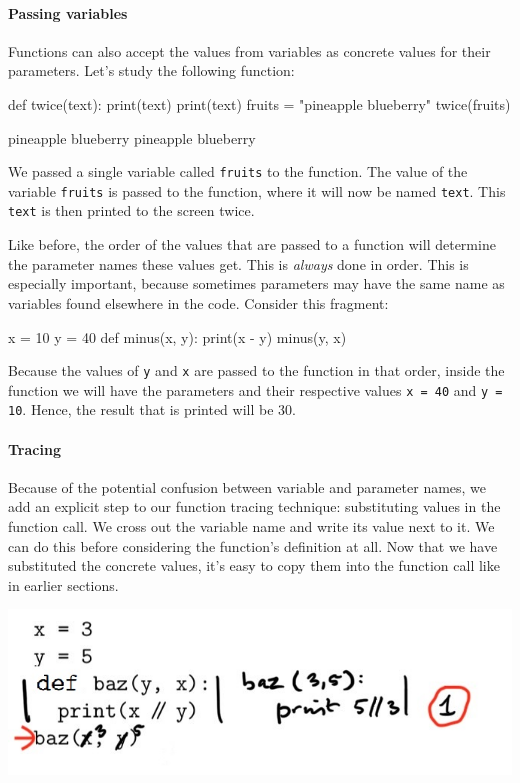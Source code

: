 \paragraph{Passing variables}

Functions can also accept the values from variables as concrete values for their parameters. Let's study the following function:

\begin{minipage}[t]{0.45\textwidth}
\vspace{-3pt}
\begin{nllisting}
def twice(text):
    print(text)
    print(text)
fruits = "pineapple blueberry"
twice(fruits)
\end{nllisting}
\end{minipage}
\begin{minipage}[t]{0.45\textwidth}
\vspace{0pt}
\begin{listing}
pineapple blueberry
pineapple blueberry
\end{listing}
\end{minipage}

We passed a single variable called \texttt{fruits} to the function. The value of the variable \texttt{fruits} is passed to the function, where it will now be named \texttt{text}. This \texttt{text} is then printed to the screen twice.

Like before, the order of the values that are passed to a function will determine the parameter names these values get. This is \emph{always} done in order. This is especially important, because sometimes parameters may have the same name as variables found elsewhere in the code. Consider this fragment:

\begin{nnflisting}
x = 10
y = 40
def minus(x, y):
    print(x - y)
minus(y, x)
\end{nnflisting}

Because the values of \texttt{y} and \texttt{x} are passed to the function in that order, inside the function we will have the parameters and their respective values \texttt{x = 40} and \texttt{y = 10}. Hence, the result that is printed will be 30.

\paragraph{Tracing}

Because of the potential confusion between variable and parameter names, we add an explicit step to our function tracing technique: substituting values in the function call. We cross out the variable name and write its value next to it. We can do this before considering the function's definition at all. Now that we have substituted the concrete values, it's easy to copy them into the function call like in earlier sections.

\includegraphics[width=.8\textwidth]{3-trace-varsparams.jpeg}
